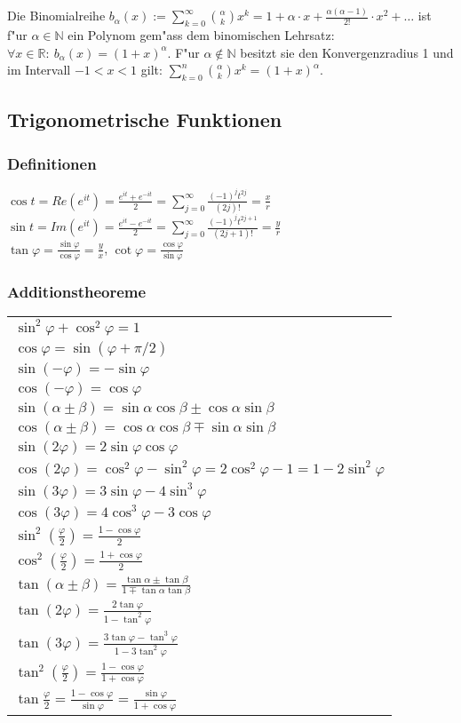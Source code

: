 \documentclass[10pt, a4paper, twocolumn]{scrartcl}
\begin{document}
Die Binomialreihe $b_\alpha(x):=\sum^\infty_{k=0}\binom{\alpha}{k}x^k=1+\alpha\cdotp x +\frac{\alpha (\alpha - 1)}{2!}\cdotp x^2+\ldots$ ist f"ur $\alpha \in \mathbb{N}$ ein Polynom gem"ass dem binomischen Lehrsatz: $\forall x\in\mathbb{R}:\:b_\alpha (x)=(1+x)^\alpha$. F"ur $\alpha\not\in\mathbb{N}$ besitzt sie den Konvergenzradius 1 und im Intervall $-1<x<1$ gilt: $\sum^n_{k=0}\binom{\alpha}{k}x^k=(1+x)^\alpha$.\\

\subsection{Trigonometrische Funktionen}

\subsubsection{Definitionen}

$\cos t= Re(e^{it})=\frac{e^{it}+e^{-it}}{2}=\sum^\infty_{j=0}\frac{(-1)^j t^{2j}}{(2j)!}=\frac{x}{r}$\\
$\sin t= Im(e^{it})=\frac{e^{it}-e^{-it}}{2}=\sum^\infty_{j=0}\frac{(-1)^j t^{2j+1}}{(2j+1)!}=\frac{y}{r}$\\
$\tan \varphi =\frac{\sin \varphi}{\cos\varphi}=\frac{y}{x}$, $\cot \varphi =\frac{\cos \varphi}{\sin\varphi}$

\subsubsection{Additionstheoreme}
\begin{tabular}{l}
 $\sin^2\varphi+\cos^2\varphi=1$\\
 $\cos\varphi=\sin(\varphi+\pi/2)$\\
 $\sin(-\varphi)=-\sin\varphi$\\
 $\cos(-\varphi)=\cos\varphi$\\
 $\sin(\alpha\pm\beta)=\sin\alpha\cos\beta\pm\cos\alpha\sin\beta$\\
 $\cos(\alpha\pm\beta)=\cos\alpha\cos\beta\mp\sin\alpha\sin\beta$\\
 $\sin(2\varphi)=2\sin\varphi\cos\varphi$\\
 $\cos(2\varphi)=\cos^2\varphi-\sin^2\varphi=2\cos^2\varphi-1=1-2\sin^2\varphi$\\
 $\sin(3\varphi)=3\sin\varphi-4\sin^3\varphi$\\
 $\cos(3\varphi)=4\cos^3\varphi-3\cos\varphi$\\
 $\sin^2(\frac{\varphi}{2})=\frac{1-\cos\varphi}{2}$\\
 $\cos^2(\frac{\varphi}{2})=\frac{1+\cos\varphi}{2}$\\
 $\tan(\alpha\pm\beta)=\frac{\tan\alpha\pm\tan\beta}{1\mp\tan\alpha\tan\beta}$\\
 $\tan(2\varphi)=\frac{2\tan\varphi}{1-\tan^2\varphi}$\\
 $\tan(3\varphi)=\frac{3\tan\varphi-\tan^3\varphi}{1-3\tan^2\varphi}$\\
 $\tan^2(\frac{\varphi}{2})=\frac{1-\cos\varphi}{1+\cos\varphi}$\\
 $\tan\frac{\varphi}{2}=\frac{1-\cos\varphi}{\sin\varphi}=\frac{\sin\varphi}{1+\cos\varphi}$
\end{tabular}
\end{document}
